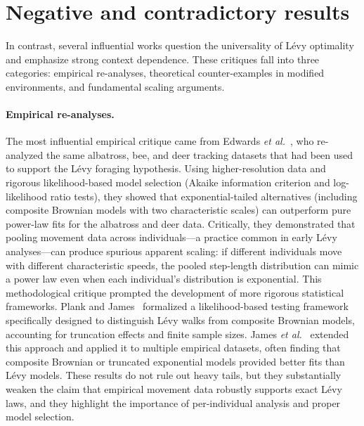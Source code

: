 \section{Negative and contradictory results}
\label{sec:negative}
In contrast, several influential works question the universality of L\'evy optimality and emphasize strong context dependence. These critiques fall into three categories: empirical re-analyses, theoretical counter-examples in modified environments, and fundamental scaling arguments.

\paragraph{Empirical re-analyses.}
The most influential empirical critique came from Edwards \emph{et al.}~\cite{edwards2007revisiting}, who re-analyzed the same albatross, bee, and deer tracking datasets that had been used to support the L\'evy foraging hypothesis. Using higher-resolution data and rigorous likelihood-based model selection (Akaike information criterion and log-likelihood ratio tests), they showed that exponential-tailed alternatives (including composite Brownian models with two characteristic scales) can outperform pure power-law fits for the albatross and deer data. Critically, they demonstrated that pooling movement data across individuals---a practice common in early L\'evy analyses---can produce spurious apparent scaling: if different individuals move with different characteristic speeds, the pooled step-length distribution can mimic a power law even when each individual's distribution is exponential. This methodological critique prompted the development of more rigorous statistical frameworks. Plank and James~\cite{plank2008optimal} formalized a likelihood-based testing framework specifically designed to distinguish L\'evy walks from composite Brownian models, accounting for truncation effects and finite sample sizes. James \emph{et al.}~\cite{james2011assessing} extended this approach and applied it to multiple empirical datasets, often finding that composite Brownian or truncated exponential models provided better fits than L\'evy models. These results do not rule out heavy tails, but they substantially weaken the claim that empirical movement data robustly supports exact L\'evy laws, and they highlight the importance of per-individual analysis and proper model selection.

